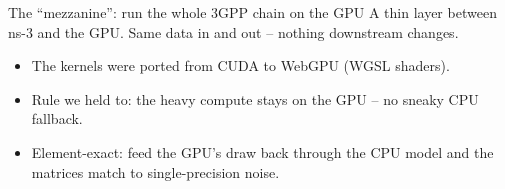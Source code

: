 \documentclass[aspectratio=169,11pt]{beamer}
\newcommand{\code}[1]{\texttt{\small #1}}
\begin{document}
\begin{frame}{The ``mezzanine'': run the whole 3GPP chain on the GPU}
  A thin layer \alert{between} ns-3 and the GPU. Same data in and out -- nothing
  downstream changes.
  \vspace{0.5em}
  \begin{center}
  \end{center}
  \begin{itemize}\small
    \item The kernels were ported from \alert{CUDA to WebGPU} (WGSL shaders).
    \item Rule we held to: the \alert{heavy compute stays on the GPU} -- no
          sneaky CPU fallback.
    \item \alert{Element-exact}: feed the GPU's draw back through the CPU model
          and the matrices match to single-precision noise.
  \end{itemize}
\end{frame}
\end{document}
